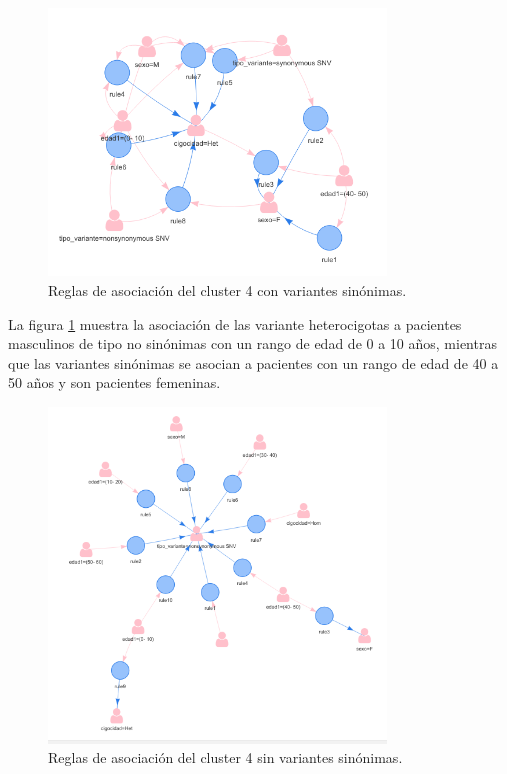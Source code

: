 \begin{figure}[H]
	\centering
	\includegraphics[width=0.8\textwidth]{Kap4/reglas4_1}
	\caption{Reglas de asociación del cluster 4 con variantes sinónimas.} \label{fig:r4}
\end{figure}

La figura \ref{fig:r4} muestra la asociación de las variante heterocigotas a pacientes masculinos de tipo no sinónimas con un rango de edad de 0 a 10 años, mientras que las variantes sinónimas se asocian a pacientes con un rango de edad de 40 a 50 años y son pacientes femeninas. 

\begin{figure}[H]
	\centering
	\includegraphics[width=0.8\textwidth]{Kap4/reglas4_2}
	\caption{Reglas de asociación del cluster 4 sin variantes sinónimas.} \label{fig:re4}
\end{figure}

